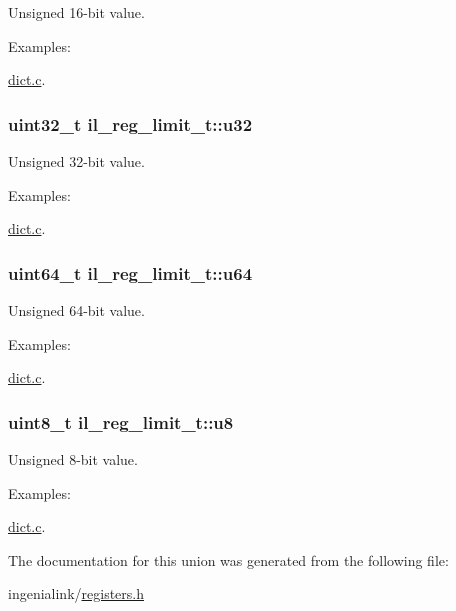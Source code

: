 Unsigned 16-\/bit value. 

\begin{Desc}
\item[Examples\+: ]\par
\hyperlink{dict_8c-example}{dict.\+c}.\end{Desc}
\subsubsection[{\texorpdfstring{u32}{u32}}]{\setlength{\rightskip}{0pt plus 5cm}uint32\+\_\+t il\+\_\+reg\+\_\+limit\+\_\+t\+::u32}\hypertarget{unionil__reg__limit__t_a99cf1ff5d5bf0ce76943d15260270211}{}\label{unionil__reg__limit__t_a99cf1ff5d5bf0ce76943d15260270211}


Unsigned 32-\/bit value. 

\begin{Desc}
\item[Examples\+: ]\par
\hyperlink{dict_8c-example}{dict.\+c}.\end{Desc}
\subsubsection[{\texorpdfstring{u64}{u64}}]{\setlength{\rightskip}{0pt plus 5cm}uint64\+\_\+t il\+\_\+reg\+\_\+limit\+\_\+t\+::u64}\hypertarget{unionil__reg__limit__t_aedc5d365162d7f0cf32035695ae0971b}{}\label{unionil__reg__limit__t_aedc5d365162d7f0cf32035695ae0971b}


Unsigned 64-\/bit value. 

\begin{Desc}
\item[Examples\+: ]\par
\hyperlink{dict_8c-example}{dict.\+c}.\end{Desc}
\subsubsection[{\texorpdfstring{u8}{u8}}]{\setlength{\rightskip}{0pt plus 5cm}uint8\+\_\+t il\+\_\+reg\+\_\+limit\+\_\+t\+::u8}\hypertarget{unionil__reg__limit__t_aef9083c76539d64e3ca03239a7646f07}{}\label{unionil__reg__limit__t_aef9083c76539d64e3ca03239a7646f07}


Unsigned 8-\/bit value. 

\begin{Desc}
\item[Examples\+: ]\par
\hyperlink{dict_8c-example}{dict.\+c}.\end{Desc}


The documentation for this union was generated from the following file\+:\begin{DoxyCompactItemize}
\item 
ingenialink/\hyperlink{registers_8h}{registers.\+h}\end{DoxyCompactItemize}
